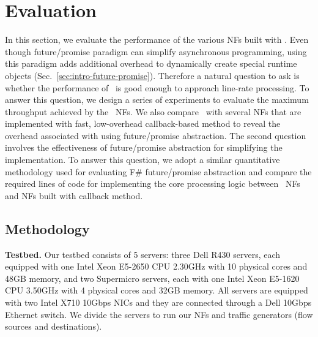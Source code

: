 \section {Evaluation}

In this section, we evaluate the performance of the various NFs built with \netstar. Even though future/promise paradigm can simplify asynchronous programming, using this paradigm adds additional overhead to dynamically create special runtime objects (Sec.~\ref{sec:intro-future-promise}). Therefore a natural question to ask is whether the performance of \netstar~is good enough to approach line-rate processing. To answer this question, we design a series of experiments to evaluate the maximum throughput achieved by the \netstar~NFs. We also compare \netstar~with several NFs that are implemented with fast, low-overhead callback-based method to reveal the overhead associated with using future/promise abstraction. The second question involves the effectiveness of future/promise abstraction for simplifying the implementation. To answer this question, we adopt a similar quantitative methodology \cite{syme2011f} used for evaluating F\# future/promise abstraction and compare the required lines of code for implementing the core processing logic between \netstar~NFs and NFs built with callback method.

\subsection {Methodology}

\noindent \textbf{Testbed.} Our testbed consists of 5 servers: three Dell R430 servers, each equipped with one Intel Xeon E5-2650 CPU 2.30GHz with 10 physical cores and 48GB memory, and two Supermicro servers, each with one Intel Xeon E5-1620 CPU 3.50GHz with 4 physical cores and 32GB memory. All servers are equipped with two Intel X710 10Gbps NICs and they are connected through a Dell 10Gbps Ethernet switch. We divide the servers to run our NFs and traffic generators (flow sources and destinations). %

